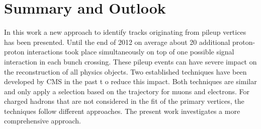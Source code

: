 \chapter{Summary and Outlook \label{sec:SandO}}

In this work a new approach to identify tracks originating from pileup vertices has been presented. Until the end of 2012 on average about 20 additional proton-proton interactions took place simultaneously on top of one possible signal interaction in each bunch crossing. These pileup events can have severe impact on the reconstruction of all physics objects. Two established techniques have been developed by CMS in the past t o reduce this impact. Both techniques are similar and only apply a selection based on the trajectory for muons and electrons. For charged hadrons that are not considered in the fit of the primary vertices, the techniques follow different approaches. The present work investigates a more comprehensive approach.

